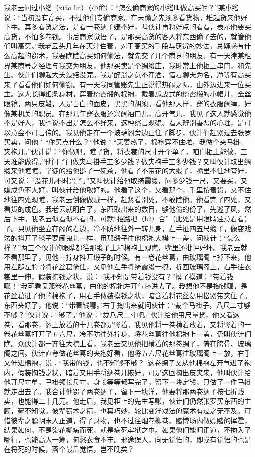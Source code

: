 \documentclass[12pt,UTF8]{ctexbook}
\begin{document}
我老云问过小绺（xiáo liu）（小偷）：“怎么偷商家的小绺叫做高买呢？”某小绺说：“当初没有高买，不过他们专偷商家。在未偷之先须多看货物，堆起货来他好下手。其多看货之法，是看一卷绸子嫌不好，叫伙计再将好点的看看，表示他要买高货，不怕多花钱。事后商家觉悟了，是那买高货的客人将东西偷了去的，就管他们叫高买。”我老云头几年在天津住着，对于高买的手段与窃货的妙法，总疑惑有什么高超的窃术，我要瞧瞧高买如何偷法，就先交了几个商界的朋友。有一天津某租界某商号之经理与我交为朋友，他那买卖是个绸缎庄，我时常上他柜上串门，和先生、伙计们聊起大天没结没完。我是醉翁之意不在酒，借着聊天为名，净等有高买来了看看他们如何偷窃。有一天我同管账先生正说得热闹之际，由外边进来一位买主。这人长得细条身材，穿着绮霞缎的棉袍，戴着瓜皮式的绮霞缎的小帽儿，金丝眼镜，两只皮鞋，人是白白的面皮，黑黑的胡须。看他那人样，穿的衣服阔绰，好像某机关的职员。在那几年穿衣服还兴阔袖口儿，高开气儿，我见了这人就感觉他不是好人，我也说不出是怎么不好来，这种察言观貌、看人辨别善恶的心理，是可以意会不可言传的。我见他走在一个玻璃阁旁边止住了脚步，伙计们赶紧过去张罗买卖，问他：“你买点什么？”他说：“天要热了，棉袍穿不住啦，我做个夹马褂、夹袍儿。”伙计说：“你做吧。瞧了货，将衣裳的尺寸开个单子，咱们柜上能做，三天准能做得。”他问了问做夹马褂手工多少钱？做夹袍手工多少钱？又叫伙计取出绸缎来他瞧瞧。学徒的给他斟了一碗茶，他看了不带花的大缎子，嘴里不住地夸好，可又说：“没花儿不时兴了。”又叫伙计给他取绮霞缎，问多少钱一尺，又要买，又嫌成色不大好，叫伙计给他取好的。他看了这个，又看那个，手里按着货，又不住地往四处观瞧。我老云倒像做贼一样，赶紧看别处，不敢瞧他。他看完了四处，又看货的成色。我老云就明白了，东西取出来的数目，够他偷的份了，先巡了风，然后下手。我老云似看似不看的，可就“招路把（bǎ）合”（此处是用眼睛注意着看）了。只见他坐立在阁的右边，冷不防地往外一转儿身，左手扯四五尺缎子，像变戏法的抖开了毯子要闹鬼儿一样，用那缎子往他棉袍大襟上一盖，问伙计：“怎么样？”两三个伙计的眼睛都往那缎子上和棉袍上观瞧，嘴里还批评好坏。我老云就不看那里了，见他一拧身抖开缎子的时候，有一卷花丝葛，由玻璃阁上掉下来，他用左腿左胯骨将花丝葛倚住，又见他左手将绮霞缎一撩，折回玻璃阁上，右手往衣裳里一伸，假装掏钱之状，说：“我不知是带着钱没有？”摸了摸道：“带着钱哪！”我可看见那卷花丝葛，由他的棉袍左开气挤进去了。我想他不是掏钱哪，是花丝葛进了他的棉袍了，用右手做装摸钱之状，暗含着将花丝葛用松紧带夹住了。东西夹好了，他说：“带着钱哪。”右手掏出来就问伙计：“裁个马褂子，八尺二寸够不够？”伙计说：“够了。”他说：“裁八尺二寸吧。”伙计给他用尺量货，他又看这卷，看那卷，阁上放着的十几卷都是竖着。我见他将一卷横着放着，又将竖着的一卷花丝葛打开了五六尺，冷不防往外拧身，将花丝葛往他棉袍上一盖，仍叫伙计们瞧。众伙计都一齐往大襟上看，我老云又见他把横着的那卷绸子，倚在胯骨、玻璃阁之间。伙计直夸做花丝葛的夹袍好看，他将五六尺花丝葛往玻璃阁上一放，右手又伸进棉袍，说：“我带的钱，也不知够不够？”这卷绸子又从他棉袍左开气进了袍内，假装掏钱之状，暗着又用手将绸卷儿掖好。可是这回掏出皮夹来，他叫伙计给他开尺寸单，马褂领长尺寸，身长等等都写完了，留下一块定钱，只做了一件马褂就走出去了。我合计他窃了两卷绸子，留下一块洋，他要将那两卷绸子按七折贱卖，也能得二十几元。他走后，我见柜上的先生写账，伙计们仍然张罗买东西的主顾，毫不知觉。彼辈窃术之精，也真巧妙，较比变洋戏法的魔术有过之无不及。可惜彼辈之聪明未入正道，得了财物，也不过往烟花柳巷、赌博场内做嫖赌的挥霍，结果如何，不是染花柳病而死，就是病死牢狱之中。如果他们能归正道，不拘入了哪行，也能高人一筹，何愁衣食不丰。邪途误人，向无觉悟的，即或有觉悟的也是在将死的时候，落个最后觉悟，岂不晚矣？
\end{document}
